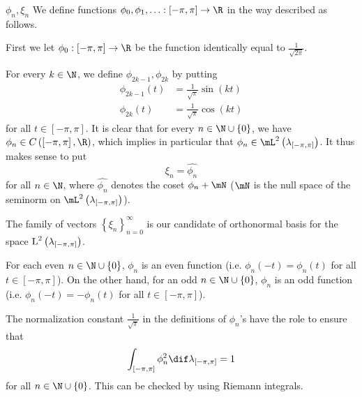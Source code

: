 \documentclass[pmath450]{subfiles}
\begin{document}
    \begin{notation}{$\phi_n, \xi_n$}
        We define functions $\phi_0,\phi_1,\ldots:\left[ -\pi,\pi \right]\to\R$ in the way described as follows. 

        First we let $\phi_0:\left[ -\pi,\pi \right]\to\R$ be the function identically equal to $\frac{1}{\sqrt{2\pi}}$.

        For every $k\in\N$, we define $\phi_{2k-1}, \phi_{2k}$ by putting
        \begin{equation*}
            \begin{aligned}
                \phi_{2k-1}\left( t \right) & = \frac{1}{\sqrt{\pi}}\sin\left( kt \right) \\
                \phi_{2k}\left( t \right) & = \frac{1}{\sqrt{\pi}}\cos\left( kt \right)
            \end{aligned} 
        \end{equation*}
        for all $t\in\left[ -\pi,\pi \right]$. It is clear that for every $n\in\N\cup\left\lbrace 0 \right\rbrace$, we have $\phi_n\in C\left( \left[ -\pi,\pi \right],\R \right)$, which implies in particular that $\phi_n\in\mL^{2}\left( \lambda_{\left[ -\pi,\pi \right]} \right)$. It thus makes sense to put 
        \begin{equation*}
            \xi_n = \hat{\phi_n}
        \end{equation*}
        for all $n\in\N$, where $\hat{\phi_n}$ denotes the coset $\phi_n+\mN$ ($\mN$ is the null space of the seminorm on $\mL^{2}\left( \lambda_{\left[ -\pi,\pi \right]} \right)$).
    \end{notation}
    
    \np The family of vectors $\left\lbrace \xi_n \right\rbrace^{\infty}_{n=0}$ is our candidate of orthonormal basis for the space $\operatorname{L}^{2}\left( \lambda_{\left[ -\pi,\pi \right]} \right)$.
    
    \np For each even $n\in\N\cup\left\lbrace 0 \right\rbrace$, $\phi_n$ is an even function (i.e. $\phi_n\left( -t \right)=\phi_n\left( t \right)$ for all $t\in\left[ -\pi,\pi \right]$). On the other hand, for an odd $n\in\N\cup\left\lbrace 0 \right\rbrace$, $\phi_n$ is an odd function (i.e. $\phi_n\left( -t \right)=-\phi_n\left( t \right)$ for all $t\in\left[ -\pi,\pi \right]$).

    \np The normalization constant $\frac{1}{\sqrt{\pi}}$ in the definitions of $\phi_n$'s have the role to ensure that
    \begin{equation}
        \int^{}_{\left[ -\pi,\pi \right]}\phi^{2}_n \dif\lambda_{\left[ -\pi,\pi \right]} = 1
    \end{equation}
    for all $n\in\N\cup\left\lbrace 0 \right\rbrace$. This can be checked by using Riemann integrals.
\end{document}
